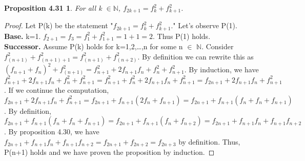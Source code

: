 \documentclass[12pt]{amsart}
\newcommand{\N}{\mathbb{N}}
\begin{document}
\newtheorem*{prop4.31}{Proposition 4.31}
\begin{prop4.31}
	For all k $\in \N$, $f_{2k+1} = f_k^2 + f_{k+1}^2$.
\end{prop4.31}

\begin{proof}
	Let P(k) be the statement "$f_{2k+1} = f_k^2 + f_{k+1}^2$." Let's observe P(1).
	\\\textbf{Base.} k=1. $f_{2+1} = f_{3} =f_1^2 + f_{1+1}^2 = 1 + 1 = 2$. Thus P(1) holds.
	\\\textbf{Successor.} Assume P(k) holds for k=1,2,\dots,n for some n $\in$ $\N$. Consider $f_{(n+1)}^2 + f_{(n+1)+1}^2 = f_{(n+1)}^2 + f_{(n+2)}^2$. By definition we can rewrite this as $(f_{n+1} + f_{n})^2 + f_{(n+1)}^2 = f_{n+1}^{2} + 2f_{n+1}f_{n} + f_{n}^{2} + f_{n+1}^2$. By induction, we have $f_{n+1}^{2} + 2f_{n+1}f_{n} + f_{n}^{2} + f_{n+1}^2 = f_{n+1}^{2} + f_{n}^{2} + 2f_{n+1}f_{n} + f_{n+1}^2 = f_{2n+1} + 2f_{n+1}f_{n} + f_{n+1}^2$. If we continue the computation, $f_{2n+1} + 2f_{n+1}f_{n} + f_{n+1}^2 = f_{2n+1} + f_{n+1}(2f_{n} + f_{n+1}) = f_{2n+1} + f_{n+1}(f_{n} + f_{n} + f_{n+1})$. By definition, $f_{2n+1} + f_{n+1}(f_{n} + f_{n} + f_{n+1}) = f_{2n+1} + f_{n+1}(f_{n} + f_{n+2}) = f_{2n+1} + f_{n+1}f_{n} + f_{n+1}f_{n+2}$. By proposition 4.30, we have $f_{2n+1} + f_{n+1}f_{n} + f_{n+1}f_{n+2} = f_{2n+1} + f_{2n+2} = f_{2n+3}$ by definition. Thus, P(n+1) holds and we have proven the proposition by induction.
\end{proof}
\end{document}
